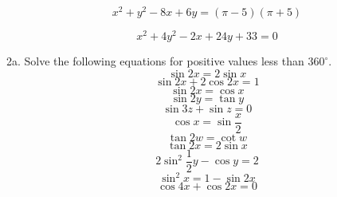 \documentclass[11pt]{article}
\begin{document}
\begin{equation}
  \label{eq:aepheipi}
x^{2}+y^{2}-8x+6y=(\pi-5)(\pi+5)
\end{equation}

\begin{equation}
  \label{eq:vogeobab}
x^{2}+4y^{2}-2x+24y+33=0
\end{equation}

2a. Solve the following equations for positive values less than
$360^{\circ}$. 
\begin{equation}
  \label{eq:uxohjeib}
\sin{}2x=2\sin{}x
\end{equation}
\begin{equation}
  \label{eq:eicohrae}
\sin{}2x+2\cos{}2x=1
\end{equation}
\begin{equation}
  \label{eq:epuufeca}
\sin{}2x=\cos{}x
\end{equation}
\begin{equation}
  \label{eq:weungodu}
\sin{}2y=\tan{}y
\end{equation}
\begin{equation}
  \label{eq:oraighah}
\sin{}3z+\sin{}z=0
\end{equation}
\begin{equation}
  \label{eq:saenonge}
\cos{}x=\sin\frac{x}{2}
\end{equation}
\begin{equation}
  \label{eq:eeghoghi}
\tan{}2w=\cot{}w
\end{equation}
\begin{equation}
  \label{eq:eesicaet}
\tan{}2x=2\sin{}x
\end{equation}
\begin{equation}
  \label{eq:fixahfee}
2\sin^{2}\frac{1}{2}y-\cos{}y=2
\end{equation}
\begin{equation}
  \label{eq:iesiwoox}
\sin^{2}x=1-\sin{}2x
\end{equation}
\begin{equation}
  \label{eq:eemengaj}
  \cos{}4x+\cos{}2x=0
\end{equation}
\end{document}
